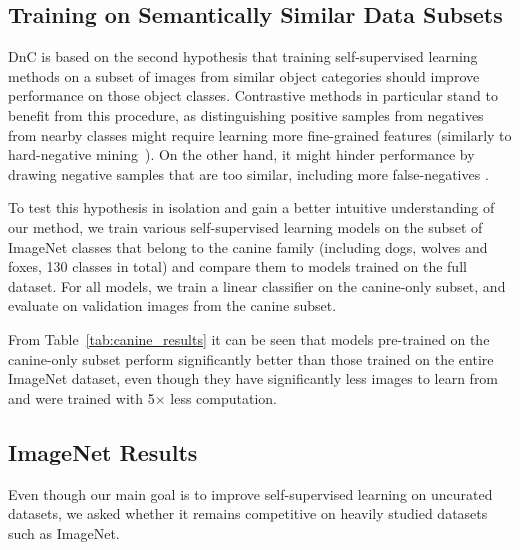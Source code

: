 \documentclass[final]{cvpr}
\begin{document}
\subsection{Training on Semantically Similar Data Subsets}
\label{section:canine_experiments}
DnC is based on the second hypothesis that training self-supervised learning methods on a subset of images from similar object categories should improve performance on those object classes. 
Contrastive methods in particular stand to benefit from this procedure, as distinguishing positive samples from negatives from nearby classes might require learning more fine-grained features 
(similarly to hard-negative mining~\cite{schroff2015facenet,kalantidis2020hard}). On the other hand, it might hinder performance by drawing negative samples that are too similar, including more false-negatives \cite{chuang2020debiased}. 

To test this hypothesis in isolation and gain a better intuitive understanding of our method, we train various self-supervised learning models on the subset of ImageNet classes that belong to the canine family (including dogs, wolves and foxes, 130 classes in total) and compare them to models trained on the full dataset. For all models, we train a linear classifier on the canine-only subset, and evaluate on validation images from the canine subset. 


From Table~\ref{tab:canine_results} it can be seen that models pre-trained on the canine-only subset perform significantly better than those trained on the entire ImageNet dataset, even though they have significantly less images to learn from and were trained with 5$\times$ less computation.

\subsection{ImageNet Results}
Even though our main goal is to improve self-supervised learning on uncurated datasets, we asked whether it remains competitive on heavily studied datasets such as ImageNet.
\end{document}
